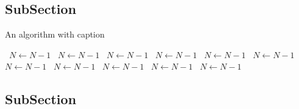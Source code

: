 \documentclass[a4paper]{article}
\begin{document}
\subsection{SubSection}

\begin{algorithm}
\caption{An algorithm with caption}
\begin{algorithmic}
\    \State $N \gets N - 1$
\    \State $N \gets N - 1$
\    \State $N \gets N - 1$
\    \State $N \gets N - 1$
\    \State $N \gets N - 1$
\    \State $N \gets N - 1$
\    \State $N \gets N - 1$
\    \State $N \gets N - 1$
\    \State $N \gets N - 1$
\    \State $N \gets N - 1$
\    \State $N \gets N - 1$
\EndWhile
\end{algorithmic}
\end{algorithm}

\subsection{SubSection}
\end{document}
